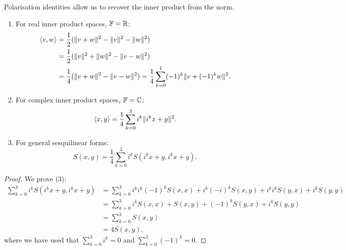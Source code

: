 Polarisation identities allow us to recover the inner product from the norm.
\begin{theorem} \label{polarisationIdentities}
\mbox{}
\begin{enumerate}
\item For real inner product spaces, $\mathbb{F} = \mathbb{R}$:
\begin{align*}
\left\langle v,w \right\rangle &= \frac{1}{2}(\lVert v+w\rVert^2 - \lVert v\rVert^2-\lVert w\rVert^2) \\
&= \frac{1}{2}(\lVert v\rVert^2 + \lVert w\rVert^2-\lVert v-w\rVert^2) \\
&= \frac{1}{4}(\lVert v+w\rVert^2 - \lVert v-w\rVert^2) = \frac{1}{4}\sum_{k=0}^1 (-1)^k\lVert v+(-1)^k w\rVert^2.
\end{align*}
\item For complex inner product spaces, $\mathbb{F} = \mathbb{C}$:
\[ \left\langle x,y \right\rangle = \frac{1}{4}\sum_{k=0}^3 i^k\lVert i^k x+y\rVert^2. \]
\item For general sesquilinear forms:
\[ S(x,y) = \frac{1}{4}\sum_{k=0}^3 i^k S(i^k x+y, i^k x+y). \]
\end{enumerate}
\end{theorem}
\begin{proof}
We prove (3):
\begin{align*}
\sum_{k=0}^3 i^k S(i^k x+y, i^k x+y) &= \sum_{k=0}^3 i^ki^k(-1)^k S(x, x) + i^k(-i)^kS(x,y) + i^ki^kS(y,x) + i^kS(y,y) \\
&= \sum_{k=0}^3 i^k S(x, x) + S(x,y) + (-1)^kS(y,x) + i^kS(y,y) \\
&= \sum_{k=0}^3 S(x,y) \\
&= 4 S(x,y),
\end{align*}
where we have used that $\sum_{k=0}^3 i^k = 0$ and $\sum_{k=0}^3 (-1)^k = 0$.
\end{proof}

